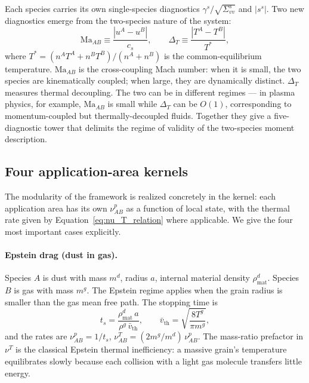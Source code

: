 \documentclass[11pt,letterpaper]{article}
\newcommand{\Ma}{\mathrm{Ma}}
\begin{document}
Each species carries its own single-species diagnostics $\gamma^s/\sqrt{\Sigma_{vv}^s}$ and $|s^s|$. Two new diagnostics emerge from the two-species nature of the system:
\begin{equation}
\Ma_{AB} \equiv \frac{|u^A - u^B|}{c_s}, \qquad \Delta_T \equiv \frac{|T^A - T^B|}{T^*},
\end{equation}
where $T^* = (n^A T^A + n^B T^B)/(n^A + n^B)$ is the common-equilibrium temperature. $\Ma_{AB}$ is the cross-coupling Mach number: when it is small, the two species are kinematically coupled; when large, they are dynamically distinct. $\Delta_T$ measures thermal decoupling. The two can be in different regimes --- in plasma physics, for example, $\Ma_{AB}$ is small while $\Delta_T$ can be $O(1)$, corresponding to momentum-coupled but thermally-decoupled fluids. Together they give a five-diagnostic tower that delimits the regime of validity of the two-species moment description.

\subsection{Four application-area kernels}

The modularity of the framework is realized concretely in the kernel: each application area has its own $\nu^p_{AB}$ as a function of local state, with the thermal rate given by Equation~\eqref{eq:nu_T_relation} where applicable. We give the four most important cases explicitly.

\paragraph{Epstein drag (dust in gas).} Species $A$ is dust with mass $m^d$, radius $a$, internal material density $\rho^d_{\mathrm{mat}}$. Species $B$ is gas with mass $m^g$. The Epstein regime applies when the grain radius is smaller than the gas mean free path. The stopping time is
\begin{equation}
t_s = \frac{\rho^d_{\mathrm{mat}}\, a}{\rho^g\, \bar v_{\mathrm{th}}}, \qquad \bar v_{\mathrm{th}} = \sqrt{\frac{8 T^g}{\pi m^g}},
\end{equation}
and the rates are $\nu^p_{AB} = 1/t_s$, $\nu^T_{AB} = (2 m^g/m^d)\,\nu^p_{AB}$. The mass-ratio prefactor in $\nu^T$ is the classical Epstein thermal inefficiency: a massive grain's temperature equilibrates slowly because each collision with a light gas molecule transfers little energy.
\end{document}
